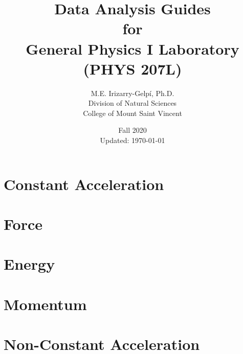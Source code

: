 \documentclass[letterpaper,12pt]{report}
\begin{document}
%
\title{\Huge{Data Analysis Guides \\ for \\ General Physics I Laboratory \\ (PHYS 207L)}}
\author{M.E. Irizarry-Gelp\'{i}, Ph.D. \\ Division of Natural Sciences \\ College of Mount Saint Vincent}
\date{Fall 2020 \\ Updated: \today}
%
\maketitle
\tableofcontents
%

%
\part{Constant Acceleration}
%


%
\part{Force}
%



%
\part{Energy}
%

%
\part{Momentum}
%


%
\part{Non-Constant Acceleration}
%


%
\appendix
%



%
\end{document}
